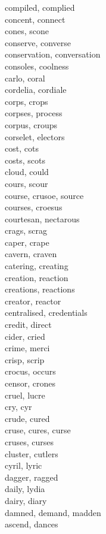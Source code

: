 compiled, complied\\
concent, connect\\
cones, scone\\
conserve, converse\\
conservation, conversation\\
consoles, coolness\\
carlo, coral\\
cordelia, cordiale\\
corps, crops\\
corpses, process\\
corpus, croups\\
corselet, electors\\
cost, cots\\
costs, scots\\
cloud, could\\
cours, scour\\
course, crusoe, source\\
courses, croesus\\
courtesan, nectarous\\
crags, scrag\\
caper, crape\\
cavern, craven\\
catering, creating\\
creation, reaction\\
creations, reactions\\
creator, reactor\\
centralised, credentials\\
credit, direct\\
cider, cried\\
crime, merci\\
crisp, scrip\\
crocus, occurs\\
censor, crones\\
cruel, lucre\\
cry, cyr\\
crude, cured\\
cruse, cures, curse\\
cruses, curses\\
cluster, cutlers\\
cyril, lyric\\
dagger, ragged\\
daily, lydia\\
dairy, diary\\
damned, demand, madden\\
ascend, dances\\
